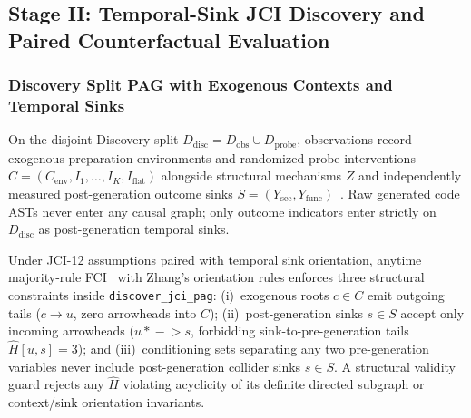 


\subsection{Stage II: Temporal-Sink JCI Discovery and Paired Counterfactual Evaluation}
\label{sec:method-causal}

\subsubsection{Discovery Split PAG with Exogenous Contexts and Temporal Sinks}
On the disjoint Discovery split $D_{\mathrm{disc}} = D_{\mathrm{obs}} \cup
D_{\mathrm{probe}}$, observations record exogenous preparation environments and
randomized probe interventions
$C = (C_{\mathrm{env}}, I_1,\dots,I_K,I_{\mathrm{flat}})$ alongside structural
mechanisms $Z$ and independently measured post-generation outcome sinks
$S = (Y_{\mathrm{sec}}, Y_{\mathrm{func}})$~\cite{mooij2020jci,peng2025cweval,dai2026rethinking}.
Raw generated code ASTs never enter any causal graph; only outcome indicators
enter strictly on $D_{\mathrm{disc}}$ as post-generation temporal sinks.

Under JCI-12 assumptions paired with temporal sink orientation, anytime
majority-rule FCI~\cite{spirtes1995fci,zhang2008ancestral} with Zhang's
orientation rules enforces three structural constraints inside
\texttt{discover\_jci\_pag}: (i)~exogenous roots $c \in C$ emit outgoing tails
($c \to u$, zero arrowheads into $C$); (ii)~post-generation sinks $s \in S$
accept only incoming arrowheads ($u \ast\!\!-\!\!\!> s$, forbidding
sink-to-pre-generation tails $\widehat{H}[u,s]=3$); and (iii)~conditioning sets
separating any two pre-generation variables never include post-generation
collider sinks $s \in S$. A structural validity guard rejects any $\widehat{H}$
violating acyclicity of its definite directed subgraph or context/sink
orientation invariants.

